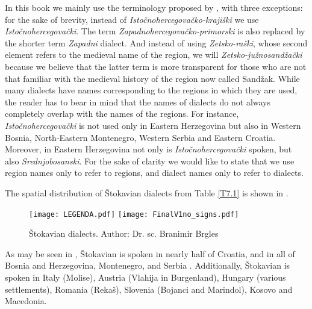 In this book we mainly use the terminology proposed by \citet{Okuka08}, with three exceptions: for the sake of brevity, instead of \textit{Istočnohercegovačko-krajiški} we use \textit{Istočnohercegovački}. The term \textit{Zapadnohercegovačko-primorski} is also replaced by the shorter term \textit{Zapadni} dialect. And instead of using \textit{Zetsko-raški}, whose second element refers to the medieval name of the region, we will \textit{Zetsko-južnosandžački} because we believe that the latter term is more transparent for those who are not that familiar with the medieval history of the region now called Sandžak. While many dialects have names corresponding to the regions in which they are used, the reader has to bear in mind that the names of dialects do not always completely overlap with the names of the regions. For instance, \textit{Istočnohercegovački} is not used only in Eastern Herzegovina but also in Western Bosnia, North-Eastern Montenegro, Western Serbia and Eastern Croatia. Moreover, in Eastern Herzegovina not only is \textit{Istočnohercegovački} spoken, but also \textit{Srednjobosanski}. For the sake of clarity we would like to state that we use region names only to refer to regions, and dialect names only to refer to dialects. 

The spatial distribution of Štokavian dialects from Table \ref{T7.1} is shown in .

\begin{figure}[ht]
\caption{Štokavian dialects. Author: Dr. sc. Branimir Brgles}
\label{M7.1}
\texttt{[image: LEGENDA.pdf]}
\texttt{[image: FinalV1no\_signs.pdf]}
\end{figure}

\newpage
As may be seen in , Štokavian is spoken in nearly half of Croatia, and in all of Bosnia and Herzegovina, Montenegro, and Serbia \citep[15]{Lisac03}. Additionally, Štokavian is spoken in Italy (Molise), Austria (Vlahija in Burgenland), Hungary (various settlements), Romania (Rekaš), Slovenia (Bojanci and Marindol), Kosovo and Macedonia. 

